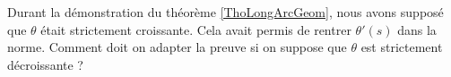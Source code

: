 \begin{exercice}\label{exoGeomAnal-0002}

	Durant la démonstration du théorème \ref{ThoLongArcGeom}, nous avons supposé que $\theta$ était strictement croissante. Cela avait permis de rentrer $\theta'(s)$ dans la norme. Comment doit on adapter la preuve si on suppose que $\theta$ est strictement décroissante ?

\end{exercice}
